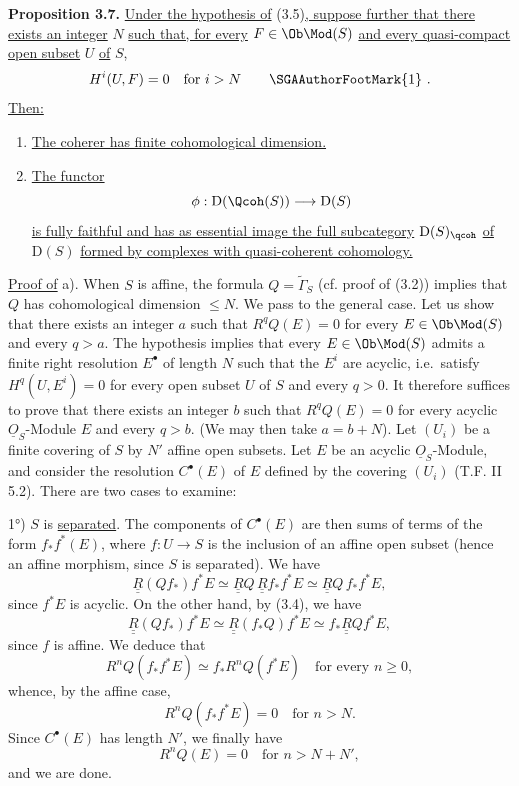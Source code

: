 \textbf{Proposition 3.7.} \uline{Under the hypothesis of} (3.5)\uline{, suppose further that there exists an integer} $N$ \uline{such that, for every} $F\in\Ob\Mod(S)$ \uline{and every quasi-compact open subset} $U$ \uline{of} $S$,
\[
 H^i(U,F)=0\quad\text{for }i>N\qquad\text{\SGAAuthorFootMark{1}}\ .
\]
\uline{Then:}
\begin{enumerate}[label=\alph*)]
\item \uline{The coherer has finite cohomological dimension.}
\item \uline{The functor}
\[
 \phi:\mathrm D(\Qcoh(S))\longrightarrow \mathrm D(S)
\]
\uline{is fully faithful and has as essential image the full subcategory} $\mathrm D(S)_{\qcoh}$ \uline{of} $\mathrm D(S)$ \uline{formed by complexes with quasi-coherent cohomology.}
\end{enumerate}

\uline{Proof of} a). When $S$ is affine, the formula $Q=\widetilde{\Gamma}_S$ (cf. proof of (3.2)) implies that $Q$ has cohomological dimension $\leq N$. We pass to the general case. Let us show that there exists an integer $a$ such that $R^qQ(E)=0$ for every $E\in\Ob\Mod(S)$ and every $q>a$. The hypothesis implies that every $E\in\Ob\Mod(S)$ admits a finite right resolution $E^\bullet$ of length $N$ such that the $E^i$ are acyclic, i.e.\ satisfy $H^q(U,E^i)=0$ for every open subset $U$ of $S$ and every $q>0$. It therefore suffices to prove that there exists an integer $b$ such that $R^qQ(E)=0$ for every acyclic $\underline{O}_S$-Module $E$ and every $q>b$. (We may then take $a=b+N$). Let $(U_i)$ be a finite covering of $S$ by $N'$ affine
%
open subsets. Let $E$ be an acyclic $\underline{O}_S$-Module, and consider the resolution $C^\bullet(E)$ of $E$ defined by the covering $(U_i)$ (T.F. II 5.2). There are two cases to examine:

1°) $S$ is \uline{separated}. The components of $C^\bullet(E)$ are then sums of terms of the form $f_*f^*(E)$, where $f:U\longrightarrow S$ is the inclusion of an affine open subset (hence an affine morphism, since $S$ is separated). We have
\[
 \underline{\underline{R}}(Qf_*)f^*E\simeq \underline{\underline{R}}Q\,\underline{\underline{R}}f_*f^*E\simeq \underline{\underline{R}}Q\,f_*f^*E,
\]
since $f^*E$ is acyclic. On the other hand, by (3.4), we have
\[
 \underline{\underline{R}}(Qf_*)f^*E\simeq \underline{\underline{R}}(f_*Q)f^*E\simeq f_*\underline{\underline{R}}Qf^*E,
\]
since $f$ is affine. We deduce that
\[
 R^nQ(f_*f^*E)\simeq f_*R^nQ(f^*E)
\quad\text{for every }n\geq0,
\]
whence, by the affine case,
\[
 R^nQ(f_*f^*E)=0\quad\text{for }n>N.
\]
Since $C^\bullet(E)$ has length $N'$, we finally have
\[
 R^nQ(E)=0\quad\text{for }n>N+N',
\]
and we are done.

